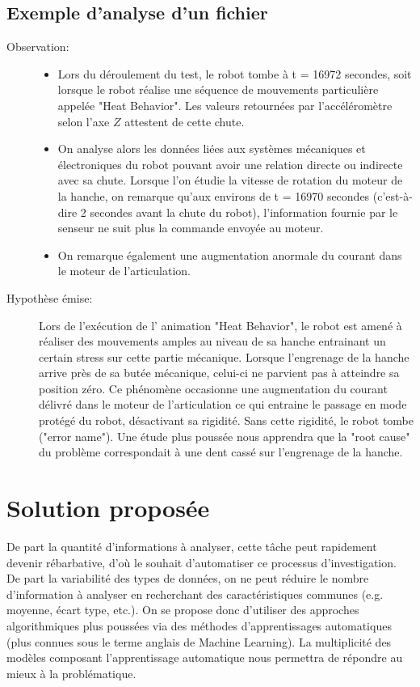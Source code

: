 \subsection{Exemple d'analyse d'un fichier}
\label{Introduction:Expression du besoin:Exemple d'analyse d'un fichier}
\begin{description}
	\item[Observation:] 
	\begin{itemize}
		\item Lors du déroulement du test, le robot tombe à t = 16972 secondes, soit lorsque le robot réalise une séquence de mouvements particulière appelée "Heat Behavior". Les valeurs retournées par l'accéléromètre selon l'axe $Z$ attestent de cette chute.
		\item On analyse alors les données liées aux systèmes mécaniques et électroniques du robot pouvant avoir une relation directe ou indirecte avec sa chute.  Lorsque l'on étudie la vitesse de rotation du moteur de la hanche, on remarque qu'aux environs de  t = 16970 secondes (c'est-à-dire 2 secondes avant la chute du robot), l'information fournie par le senseur ne suit plus la commande  envoyée au moteur.
		\item On remarque également une augmentation anormale du courant dans le moteur de l'articulation. 
	\end{itemize} 
	\item [Hypothèse émise:] Lors de l'exécution de l' animation "Heat Behavior", le robot est amené à réaliser des mouvements amples au niveau de sa hanche entrainant un certain stress sur cette partie mécanique. Lorsque l'engrenage de la hanche arrive près de sa butée mécanique, celui-ci ne parvient pas à atteindre sa position zéro.  Ce phénomène occasionne une augmentation du courant délivré dans le moteur de l'articulation ce qui entraine le passage en mode protégé du robot, désactivant sa rigidité.  Sans cette rigidité, le robot tombe ("error name"). Une étude plus poussée nous apprendra que la "root cause" du problème correspondait à une dent cassé sur l'engrenage de la hanche. 
\end{description}


\section{Solution proposée}
De part la quantité d'informations à analyser, cette tâche peut rapidement devenir rébarbative, d'où le souhait d'automatiser ce processus d'investigation. De part la variabilité des types de données, on ne peut réduire le nombre d'information à analyser en recherchant des caractéristiques communes (e.g. moyenne, écart type, etc.). On se propose donc d'utiliser des approches algorithmiques plus poussées via des méthodes d'apprentissages automatiques (plus connues sous le terme anglais de Machine Learning). La multiplicité des modèles composant l'apprentissage automatique nous permettra de répondre au mieux à la problématique.